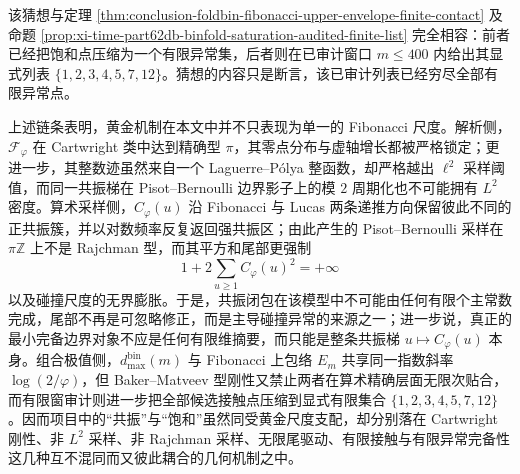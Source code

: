 


\noindent
该猜想与定理 \ref{thm:conclusion-foldbin-fibonacci-upper-envelope-finite-contact} 及命题 \ref{prop:xi-time-part62db-binfold-saturation-audited-finite-list} 完全相容：前者已经把饱和点压缩为一个有限异常集，后者则在已审计窗口 \(m\le 400\) 内给出其显式列表 \(\{1,2,3,4,5,7,12\}\)。猜想的内容只是断言，该已审计列表已经穷尽全部有限异常点。

\noindent
上述链条表明，黄金机制在本文中并不只表现为单一的 Fibonacci 尺度。解析侧，\(\mathcal F_\varphi\) 在 Cartwright 类中达到精确型 \(\pi\)，其零点分布与虚轴增长都被严格锁定；更进一步，其整数迹虽然来自一个 Laguerre--P\'olya 整函数，却严格越出 \(\ell^2\) 采样阈值，而同一共振梯在 Pisot--Bernoulli 边界影子上的模 \(2\) 周期化也不可能拥有 \(L^2\) 密度。算术采样侧，\(C_\varphi(u)\) 沿 Fibonacci 与 Lucas 两条递推方向保留彼此不同的正共振簇，并以对数频率反复返回强共振区；由此产生的 Pisot--Bernoulli 采样在 \(\pi\mathbb Z\) 上不是 Rajchman 型，而其平方和尾部更强制
\[
1+2\sum_{u\ge 1}C_\varphi(u)^2=+\infty
\]
以及碰撞尺度的无界膨胀。于是，共振闭包在该模型中不可能由任何有限个主常数完成，尾部不再是可忽略修正，而是主导碰撞异常的来源之一；进一步说，真正的最小完备边界对象不应是任何有限维摘要，而只能是整条共振梯 \(u\mapsto C_\varphi(u)\) 本身。组合极值侧，\(d_{\max}^{\mathrm{bin}}(m)\) 与 Fibonacci 上包络 \(E_m\) 共享同一指数斜率 \(\log(2/\varphi)\)，但 Baker--Matveev 型刚性又禁止两者在算术精确层面无限次贴合，而有限窗审计则进一步把全部候选接触点压缩到显式有限集合 \(\{1,2,3,4,5,7,12\}\)。因而项目中的“共振”与“饱和”虽然同受黄金尺度支配，却分别落在 Cartwright 刚性、非 \(L^2\) 采样、非 Rajchman 采样、无限尾驱动、有限接触与有限异常完备性这几种互不混同而又彼此耦合的几何机制之中。

\endinput

